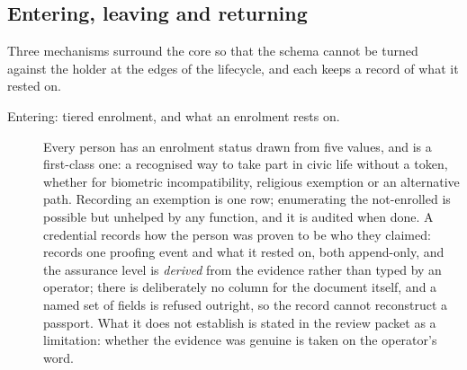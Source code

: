 \subsection{Entering, leaving and returning}

Three mechanisms surround the core so that the schema cannot be turned against the holder at the
edges of the lifecycle, and each keeps a record of what it rested on.

\begin{description}
  \item[Entering: tiered enrolment, and what an enrolment rests on.] Every person has an enrolment
    status drawn from five values, and  is a first-class one: a recognised way to take
    part in civic life without a token, whether for biometric incompatibility, religious exemption or
    an alternative path. Recording an exemption is one row; enumerating the not-enrolled is possible
    but unhelped by any function, and it is audited when done. A credential records how the person
    was proven to be who they claimed:  records one proofing event and  what
    it rested on, both append-only, and the assurance level is \emph{derived} from the evidence
    rather than typed by an operator; there is deliberately no column for the document itself, and a
    named set of fields is refused outright, so the record cannot reconstruct a passport. What it
    does not establish is stated in the review packet as a limitation: whether the evidence was
    genuine is taken on the operator's word. \sImpl


\end{description}
